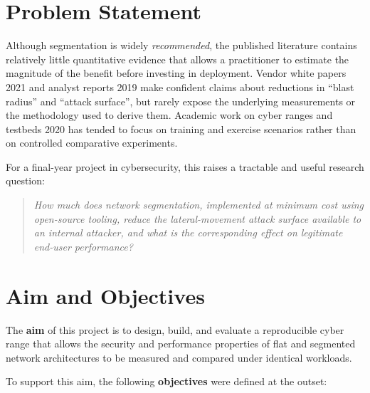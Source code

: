 \section{Problem Statement}

Although segmentation is widely \emph{recommended}, the published literature contains relatively little quantitative evidence that allows a practitioner to estimate the magnitude of the benefit before investing in deployment. Vendor white papers \parencite{VMware}{2021} and analyst reports \parencite{Gartner}{2019} make confident claims about reductions in ``blast radius'' and ``attack surface'', but rarely expose the underlying measurements or the methodology used to derive them. Academic work on cyber ranges and testbeds \parencite{Yamin, Katt and Gkioulos}{2020} has tended to focus on training and exercise scenarios rather than on controlled comparative experiments.

For a final-year project in cybersecurity, this raises a tractable and useful research question:

\begin{quote}
\textit{How much does network segmentation, implemented at minimum cost using open-source tooling, reduce the lateral-movement attack surface available to an internal attacker, and what is the corresponding effect on legitimate end-user performance?}
\end{quote}

\section{Aim and Objectives}

The \textbf{aim} of this project is to design, build, and evaluate a reproducible cyber range that allows the security and performance properties of flat and segmented network architectures to be measured and compared under identical workloads.

To support this aim, the following \textbf{objectives} were defined at the outset:

